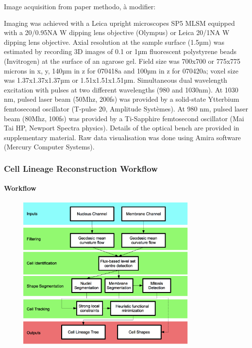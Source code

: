   Image acquisition from paper methodo, à modifier: 

  Imaging was achieved with a Leica upright microscopes SP5 MLSM equipped with a 20/0.95NA W dipping lens objective (Olympus) or Leica 20/1NA W dipping lens objective. Axial resolution at the sample surface (1.5µm) was estimated by recording 3D images of 0.1 or 1µm fluorescent polystyrene beads (Invitrogen) at the surface of an agarose gel. Field size was 700x700 or 775x775 microns in x, y, 140µm in z for 070418a and 100µm in z for 070420a; voxel size was 1.37x1.37x1.37µm or 1.51x1.51x1.51µm. Simultaneous dual wavelength excitation with pulses at two different wavelengths (980 and 1030nm). At 1030 nm, pulsed laser beam (50Mhz, 200fs) was provided by a solid-state Ytterbium femtosecond oscillator (T-pulse 20, Amplitude Systèmes). At 980 nm, pulsed laser beam (80Mhz, 100fs) was provided by a Ti-Sapphire femtosecond oscillator (Mai Tai HP, Newport Spectra physics). Details of the optical bench are provided in supplementary material. Raw data visualisation was done using Amira software (Mercury Computer Systems).  

\subsubsection{Cell Lineage Reconstruction Workflow  }

\paragraph{Workflow}
\begin{figure}
\begin{center}
\includegraphics[width=0.8\textwidth]{../../images/Reconstruction/bioemergences/FigureWorkflow/Workflow2_lineage_only.png}
\end{center}
\caption{}
\label{bioemergences_FigureWorkflow_Workflow2_lineage_only}
\end{figure}

